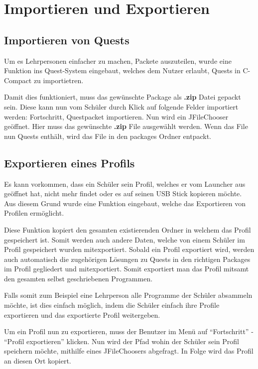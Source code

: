 \section{Importieren und Exportieren}
\subsection{Importieren von Quests}
\label{sec:quest-import}
Um es Lehrpersonen einfacher zu machen, Packete auszuteilen, wurde eine Funktion ins Quest-System eingebaut, welches dem Nutzer erlaubt, Quests in C-Compact zu importietren.

Damit dies funktioniert, muss das gewünschte Package als \textbf{.zip} Datei gepackt sein. Diese kann nun vom Schüler durch Klick auf folgende Felder importiert werden: Fortschritt, Questpacket importieren. Nun wird ein JFileChooser geöffnet. Hier muss das gewünschte \textbf{.zip} File ausgewählt werden. Wenn das File nun Quests enthält, wird das File in den packages Ordner entpackt.

\subsection{Exportieren eines Profils}
\label{sec:quest-export}
Es kann vorkommen, dass ein Schüler sein Profil, welches er vom Launcher aus geöffnet hat, nicht mehr findet oder es auf seinen USB Stick kopieren möchte. Aus diesem Grund wurde eine Funktion eingebaut, welche das Exportieren von Profilen ermöglicht.

Diese Funktion kopiert den gesamten existierenden Ordner in welchem das Profil gespeichert ist. Somit werden auch andere Daten, welche von einem Schüler im Profil gespeichert wurden mitexportiert. Sobald ein Profil exportiert wird, werden auch automatisch die zugehörigen Lösungen zu Quests in den richtigen Packages im Profil gegliedert und mitexportiert. Somit exportiert man das Profil mitsamt den gesamten selbst geschriebenen Programmen.

Falls somit zum Beispiel eine Lehrperson alle Programme der Schüler absammeln möchte, ist dies einfach möglich, indem die Schüler einfach ihre Profile exportieren und das exportierte Profil weitergeben.

Um ein Profil nun zu exportieren, muss der Benutzer im Menü auf "`Fortschritt"' - "`Profil exportieren"' klicken. Nun wird der Pfad wohin der Schüler sein Profil speichern möchte, mithilfe eines JFileChoosers abgefragt. In Folge wird das Profil an diesen Ort kopiert.
